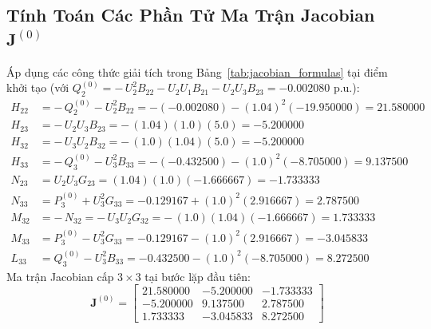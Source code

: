 \documentclass[12pt,a4paper,oneside]{report}
\begin{document}
\subsection{Tính Toán Các Phần Tử Ma Trận Jacobian $\mathbf{J}^{(0)}$}
Áp dụng các công thức giải tích trong Bảng~\ref{tab:jacobian_formulas} tại điểm khởi tạo (với $Q_2^{(0)} = -\, U_2^2 B_{22} - U_2 U_1 B_{21} - U_2 U_3 B_{23} = -0.002080\text{ p.u.}$):
\begin{align}
H_{22} &= -\, Q_2^{(0)} - U_2^2 B_{22} = -(-0.002080) - (1.04)^2 (-19.950000) = 21.580000 \\
H_{23} &= -\, U_2 U_3 B_{23} = -\, (1.04)(1.0)(5.0) = -5.200000 \\
H_{32} &= -\, U_3 U_2 B_{32} = -\, (1.0)(1.04)(5.0) = -5.200000 \\
H_{33} &= -\, Q_3^{(0)} - U_3^2 B_{33} = -(-0.432500) - (1.0)^2 (-8.705000) = 9.137500 \\
N_{23} &= U_2 U_3 G_{23} = (1.04)(1.0)(-1.666667) = -1.733333 \\
N_{33} &= P_3^{(0)} + U_3^2 G_{33} = -0.129167 + (1.0)^2 (2.916667) = 2.787500 \\
M_{32} &= -\, N_{32} = -\, U_3 U_2 G_{32} = -\, (1.0)(1.04)(-1.666667) = 1.733333 \\
M_{33} &= P_3^{(0)} - U_3^2 G_{33} = -0.129167 - (1.0)^2 (2.916667) = -3.045833 \\
L_{33} &= Q_3^{(0)} - U_3^2 B_{33} = -0.432500 - (1.0)^2 (-8.705000) = 8.272500
\end{align}
Ma trận Jacobian cấp $3 \times 3$ tại bước lặp đầu tiên:
\begin{equation}
\mathbf{J}^{(0)} =
\begin{bmatrix}
21.580000 & -5.200000 & -1.733333 \\
-5.200000 & 9.137500 & 2.787500 \\
1.733333 & -3.045833 & 8.272500
\end{bmatrix}
\end{equation}
\end{document}
